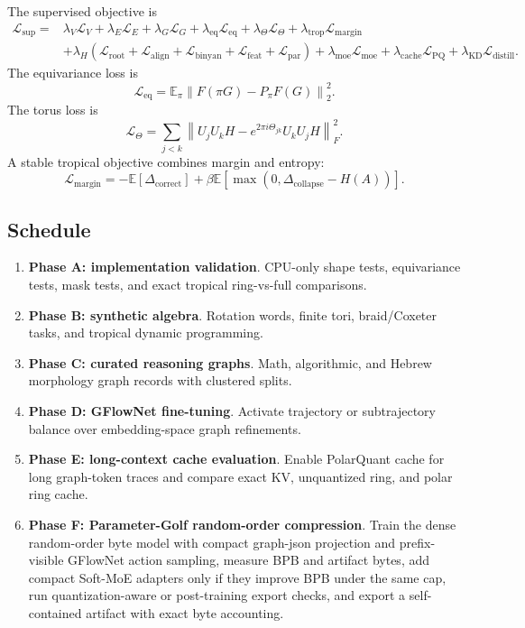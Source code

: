 \documentclass[11pt]{article}
\theoremstyle{definition}
\theoremstyle{plain}
\theoremstyle{remark}
\numberwithin{equation}{section}
\newcommand{\Eop}{\mathbb{E}}
\newcommand{\norm}[1]{\left\lVert #1\right\rVert}
\begin{document}
The supervised objective is
\begin{equation}
\begin{split}
  \mathcal L_{\mathrm{sup}}={}&\lambda_V\mathcal L_V+\lambda_E\mathcal L_E+\lambda_G\mathcal L_G+
  \lambda_{\mathrm{eq}}\mathcal L_{\mathrm{eq}}+
  \lambda_\Theta\mathcal L_\Theta+\lambda_{\mathrm{trop}}\mathcal L_{\mathrm{margin}}\\
  &+\lambda_H(\mathcal L_{\mathrm{root}}+\mathcal L_{\mathrm{align}}+\mathcal L_{\mathrm{binyan}}+\mathcal L_{\mathrm{feat}}+\mathcal L_{\mathrm{par}})
  +\lambda_{\mathrm{moe}}\mathcal L_{\mathrm{moe}}
  +\lambda_{\mathrm{cache}}\mathcal L_{\mathrm{PQ}}
  +\lambda_{\mathrm{KD}}\mathcal L_{\mathrm{distill}}.
\end{split}
\end{equation}
The equivariance loss is
\begin{equation}
  \mathcal L_{\mathrm{eq}}=\Eop_{\pi}\norm{F(\pi G)-P_\pi F(G)}_2^2.
\end{equation}
The torus loss is
\begin{equation}
  \mathcal L_\Theta=\sum_{j<k}\norm{U_jU_kH-e^{2\pi i\Theta_{jk}}U_kU_jH}_F^2.
\end{equation}
A stable tropical objective combines margin and entropy:
\begin{equation}
  \mathcal L_{\mathrm{margin}}=-\Eop[\Delta_{\mathrm{correct}}]+\beta\Eop[\max(0,\Delta_{\mathrm{collapse}}-H(A))].
\end{equation}

\subsection{Schedule}

\begin{enumerate}[leftmargin=2em]
  \item \textbf{Phase A: implementation validation}.  CPU-only shape tests, equivariance tests, mask tests, and exact tropical ring-vs-full comparisons.
  \item \textbf{Phase B: synthetic algebra}.  Rotation words, finite tori, braid/Coxeter tasks, and tropical dynamic programming.
  \item \textbf{Phase C: curated reasoning graphs}.  Math, algorithmic, and Hebrew morphology graph records with clustered splits.
  \item \textbf{Phase D: GFlowNet fine-tuning}.  Activate trajectory or subtrajectory balance over embedding-space graph refinements.
  \item \textbf{Phase E: long-context cache evaluation}.  Enable PolarQuant cache for long graph-token traces and compare exact KV, unquantized ring, and polar ring cache.
  \item \textbf{Phase F: Parameter-Golf random-order compression}.  Train the dense random-order byte model with compact graph-json projection and prefix-visible GFlowNet action sampling, measure BPB and artifact bytes, add compact Soft-MoE adapters only if they improve BPB under the same cap, run quantization-aware or post-training export checks, and export a self-contained artifact with exact byte accounting.
\end{enumerate}
\end{document}
